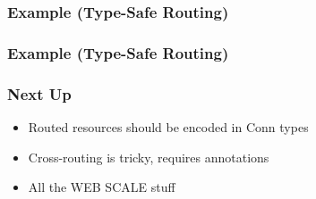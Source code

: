 \begin{frame}
  \frametitle{Example (Type-Safe Routing)}
  
\end{frame}

\begin{frame}
  \frametitle{Example (Type-Safe Routing)}
  
\end{frame}

\begin{frame}
\end{frame}

\begin{frame}
\end{frame}

\begin{frame}
  \frametitle{Next Up}
  \begin{itemize}
    \item Routed resources should be encoded in Conn types
    \item Cross-routing is tricky, requires annotations
    \item All the WEB SCALE stuff
  \end{itemize}
\end{frame}

\begin{frame}
\end{frame}

\begin{frame}
  \titlepage
\end{frame}
